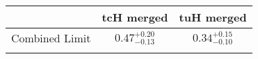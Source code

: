 \centering
\begin{tabular}{ccc} \toprule\toprule
 & tcH merged & tuH merged\\\midrule
Combined Limit & $0.47^{+0.20}_{-0.13}$ & $0.34^{+0.15}_{-0.10}$\\
\bottomrule\bottomrule\\
\end{tabular}